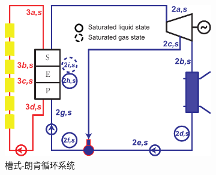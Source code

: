 \noindent \begin{figure}[htbp]
\centering
	\begin{subfigure}[b]{0.64\columnwidth}
	\includegraphics[width = \columnwidth]{fig/Trough-s}
	\caption{槽式-朗肯循环系统}\label{fig:TroughRankine}
	\end{subfigure}
	~
\begin{subfigure}[b]{0.26\columnwidth}

\end{subfigure}
\end{figure}
